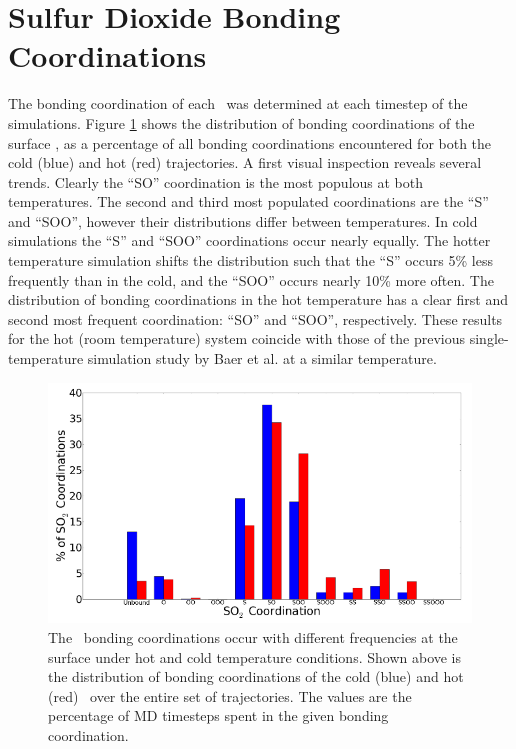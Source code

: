 \section {Sulfur Dioxide Bonding Coordinations}

The bonding coordination of each \suldiox~was determined at each timestep of the simulations. Figure \ref{fig:bonding-coordinations} shows the distribution of bonding coordinations of the surface \suldiox, as a percentage of all bonding coordinations encountered for both the cold (blue) and hot (red) trajectories. A first visual inspection reveals several trends. Clearly the ``SO'' coordination is the most populous at both temperatures. The second and third most populated coordinations are the ``S'' and ``SOO'', however their distributions differ between temperatures. In cold simulations the ``S'' and ``SOO'' coordinations occur nearly equally. The hotter temperature simulation shifts the distribution such that the ``S'' occurs 5\% less frequently than in the cold, and the ``SOO'' occurs nearly 10\% more often. The distribution of bonding coordinations in the hot temperature has a clear first and second most frequent coordination: ``SO'' and ``SOO'', respectively. These results for the hot (room temperature) system coincide with those of the previous single-temperature simulation study by Baer et al. at a similar temperature.\cite{Baer2010}

\begin{figure}[h!]
	\begin{center}
		\includegraphics[scale=1.0]{images/coordinations/so2-coordinations-percents-small.png}
		\caption{The \suldiox~bonding coordinations occur with different frequencies at the surface under hot and cold temperature conditions. Shown above is the distribution of bonding coordinations of the cold (blue) and hot (red) \suldiox~over the entire set of trajectories. The values are the percentage of MD timesteps spent in the given bonding coordination.}
		\label{fig:bonding-coordinations}
	\end{center}
\end{figure}


